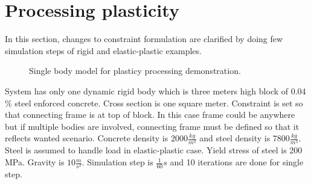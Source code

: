 \section{Processing plasticity}

In this section, changes to constraint formulation are clarified by doing few simulation steps of rigid and
elastic-plastic examples.

\begin{figure}[htb!]
\centering
{}
\caption{Single body model for plasticy processing demonstration.}
\label{fig:tensionModel}
\end{figure}

System has only one dynamic rigid body which is three meters high block of 0.04 \% steel enforced concrete. 
Cross section is one square meter.
Constraint is set so that connecting frame is at top of block. 
In this case frame could be anywhere but if multiple bodies are involved, connecting frame must be defined
so that it reflects wanted scenario.
Concrete density is $2000 \frac{kg}{m^3}$ and steel density is $7800 \frac{kg}{m^3}$. 
Steel is assumed to handle load in elastic-plastic case. Yield stress of steel is 200 MPa.
Gravity is $10 \frac{m}{s^2}$. Simulation step is $\frac{1}{60} s$ and 10 
iterations are done for single step.

